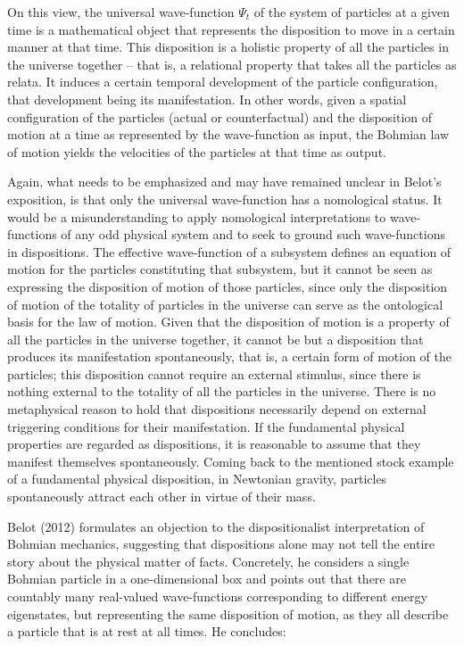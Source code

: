 \documentclass[12pt,a4paper]{article}
\theoremstyle{definition}
\begin{document}
\noindent On this view, the universal wave-function $\Psi_t$ of the system of particles at a given time is a mathematical object that represents the disposition to move in a certain manner at that time. This disposition is a holistic property of all the particles in the universe together -- that is, a relational property that takes all the particles as relata. It induces a certain temporal development of the particle configuration, that development being its manifestation. In other words, given a spatial configuration of the particles (actual or counterfactual) and the disposition of motion at a time as represented by the wave-function as input, the Bohmian law of motion yields the velocities of the particles at that time as output.

Again, what needs to be emphasized and may have remained unclear in Belot's exposition, is that only the universal wave-function has a nomological status. It would be a misunderstanding to apply nomological interpretations to wave-functions of any odd physical system and to seek to ground such wave-functions in dispositions. The effective wave-function of a subsystem defines an equation of motion for the particles constituting that subsystem, but it cannot be seen as expressing the disposition of motion of those particles, since only the disposition of motion of the totality of particles in the universe can serve as the ontological basis for the law of motion.
Given that the disposition of motion is a property of all the particles in the universe together, it cannot be but a disposition that produces its manifestation spontaneously, that is, a certain form of motion of the particles; this disposition cannot require an external stimulus, since there is nothing external to the totality of all the particles in the universe. There is no metaphysical reason to hold that dispositions necessarily depend on external triggering conditions for their manifestation. If the fundamental physical properties are regarded as dispositions, it is reasonable to assume that they manifest themselves spontaneously. Coming back to the mentioned stock example of a fundamental physical disposition, in Newtonian gravity, particles spontaneously attract each other in virtue of their mass.

Belot (2012) formulates an objection to the dispositionalist interpretation of Bohmian mechanics, suggesting that dispositions alone may not tell the entire story about the physical matter of facts. Concretely, he considers a single Bohmian particle in a one-dimensional box and points out that there are countably many real-valued wave-functions corresponding to different energy eigenstates, but representing the same disposition of motion, as they all describe a particle that is at rest at all times. He concludes:
\end{document}
